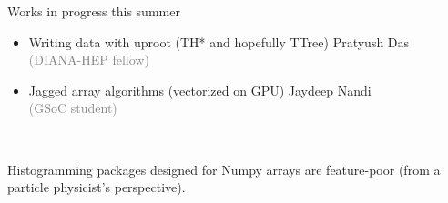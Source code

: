 \documentclass[aspectratio=169]{beamer}
\begin{document}
\begin{frame}{Works in progress this summer}
\large
\vspace{0.5 cm}
\begin{itemize}\setlength{\itemsep}{0.5 cm}
\item Writing data with uproot (TH* and hopefully TTree) \hfill Pratyush Das \\ \hfill \textcolor{gray}{\normalsize (DIANA-HEP fellow)}

\item Jagged array algorithms (vectorized on GPU) \hfill Jaydeep Nandi \\ \hfill \textcolor{gray}{\normalsize (GSoC student)}
\end{itemize}


\small
\vspace{0.25 cm}

\vspace{0.25 cm}
\mbox{ } \hfill {} \hfill \mbox{ }

\vspace{0.25 cm}
\hfill {}
\end{frame}

\begin{frame}{}
\Large
\vspace{1 cm}

Histogramming packages designed for Numpy arrays are feature-poor (from a particle physicist's perspective).

\begin{center}
\end{center}
\end{frame}

\begin{frame}{}

\end{frame}
\end{document}
